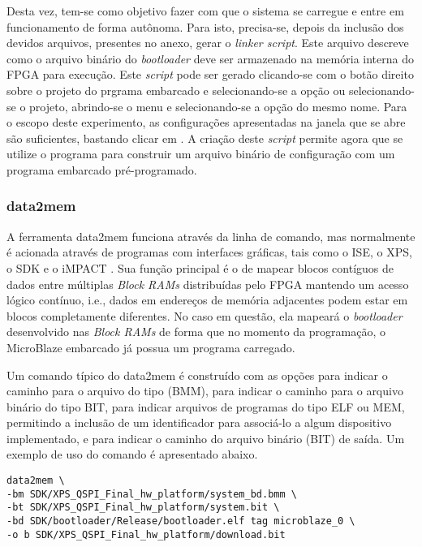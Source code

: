 \documentclass[11pt,a4paper,oneside]{book}
\begin{document}
Desta vez, tem-se como objetivo fazer com que o sistema se carregue e entre em funcionamento de forma autônoma.
Para isto, precisa-se, depois da inclusão dos devidos arquivos, presentes no anexo, gerar o \textit{linker script}.
Este arquivo descreve como o arquivo binário do \textit{bootloader} deve ser armazenado na memória interna do FPGA para execução.
Este \textit{script} pode ser gerado clicando-se com o botão direito sobre o projeto do prgrama embarcado e selecionando-se a opção  ou selecionando-se o projeto, abrindo-se o menu  e selecionando-se a opção do mesmo nome.
Para o escopo deste experimento, as configurações apresentadas na janela que se abre são suficientes, bastando clicar em .
A criação deste \textit{script} permite agora que se utilize o programa  para construir um arquivo binário de configuração com um programa embarcado pré-programado.

\subsubsection{data2mem}
A ferramenta data2mem funciona através da linha de comando, mas normalmente é acionada através de programas com interfaces gráficas, tais como o ISE, o XPS, o SDK e o iMPACT \cite{ug658}.
Sua função principal é o de mapear blocos contíguos de dados entre múltiplas \textit{Block RAMs} distribuídas pelo FPGA mantendo um acesso lógico contínuo, i.e., dados em endereços de memória adjacentes podem estar em blocos completamente diferentes.
No caso em questão, ela mapeará o \textit{bootloader} desenvolvido nas \textit{Block RAMs} de forma que no momento da programação, o MicroBlaze embarcado já possua um programa carregado.

Um comando típico do data2mem é construído com as opções  para indicar o caminho para o arquivo do tipo  (BMM),  para indicar o caminho para o arquivo binário do tipo BIT,  para indicar arquivos de programas do tipo ELF ou MEM, permitindo a inclusão de um identificador para associá-lo a algum dispositivo implementado, e  para indicar o caminho do arquivo binário (BIT) de saída.
Um exemplo de uso do comando é apresentado abaixo.
\begin{lstlisting}[style=customVHDL]
data2mem \
-bm SDK/XPS_QSPI_Final_hw_platform/system_bd.bmm \
-bt SDK/XPS_QSPI_Final_hw_platform/system.bit \
-bd SDK/bootloader/Release/bootloader.elf tag microblaze_0 \
-o b SDK/XPS_QSPI_Final_hw_platform/download.bit
\end{lstlisting}
\end{document}
